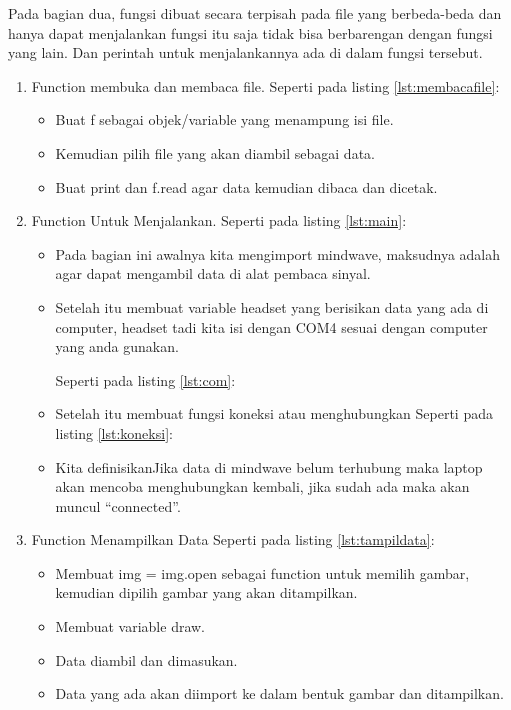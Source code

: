 Pada bagian dua, fungsi dibuat secara terpisah pada file yang berbeda-beda dan hanya dapat menjalankan fungsi itu saja tidak bisa berbarengan dengan fungsi yang lain. Dan perintah untuk menjalankannya ada di dalam fungsi tersebut.
\begin{enumerate}
\item Function membuka dan membaca file.
Seperti pada listing \ref{lst:membacafile}:

\begin{itemize}
\item Buat f sebagai objek/variable yang menampung isi file. 
\item Kemudian pilih file yang akan diambil sebagai data.
\item Buat print dan f.read agar data kemudian dibaca dan dicetak.
\end{itemize}

\item Function Untuk Menjalankan.
Seperti pada listing \ref{lst:main}:

\begin{itemize}
\item Pada bagian ini awalnya kita mengimport mindwave, maksudnya adalah agar dapat mengambil data di alat pembaca sinyal. 
\item Setelah itu membuat variable headset yang berisikan data yang ada di computer, headset tadi kita isi dengan COM4 sesuai dengan computer yang anda gunakan.

Seperti pada listing \ref{lst:com}:


\item Setelah itu membuat fungsi koneksi atau menghubungkan
Seperti pada listing \ref{lst:koneksi}:


\item Kita definisikanJika data di mindwave belum terhubung maka laptop akan mencoba menghubungkan kembali, jika sudah ada maka akan muncul “connected”.
\end{itemize}

\item Function Menampilkan Data
Seperti pada listing \ref{lst:tampildata}:

\begin{itemize}
\item Membuat img = img.open sebagai function untuk memilih gambar, kemudian dipilih gambar yang akan ditampilkan.
\item Membuat variable draw.
\item Data diambil dan dimasukan.
\item Data yang ada akan diimport ke dalam bentuk gambar dan ditampilkan.
\end{itemize}


\end{enumerate}
